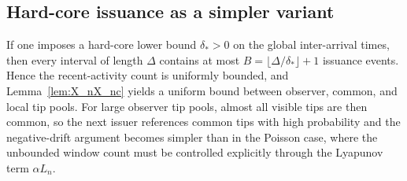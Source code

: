 \documentclass[a4paper,12pt,oneside,reqno]{amsart}
\newcommand{\1}{{\mathbf 1}}
\begin{document}
\subsection{Hard-core issuance as a simpler variant}\label{sec:hardcore-variant}
If one imposes a hard-core lower bound $\delta_\ast>0$ on the global inter-arrival times, then every interval of length $\Delta$ contains at most $B=\lfloor \Delta/\delta_\ast\rfloor+1$ issuance events. Hence the recent-activity count is uniformly bounded, and Lemma~\ref{lem:X_nX_nc} yields a uniform bound between observer, common, and local tip pools. For large observer tip pools, almost all visible tips are then common, so the next issuer references common tips with high probability and the negative-drift argument becomes simpler than in the Poisson case, where the unbounded window count must be controlled explicitly through the Lyapunov term $\alpha L_n$.



\end{document}
